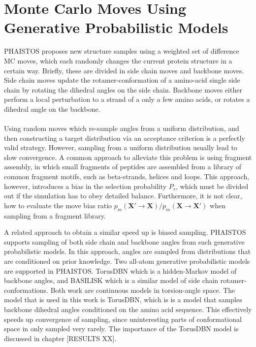 \section{Monte Carlo Moves Using Generative Probabilistic Models}
\label{chap:generative}
PHAISTOS proposes new structure samples using a weighted set of difference MC moves, which each randomly changes the current protein structure in a certain way. Briefly, these are divided in side chain moves and backbone moves.
Side chain moves update the rotamer-conformation of a amino-acid single side chain by rotating the dihedral angles on the side chain.
Backbone moves either perform a local perturbation to a strand of a only a few amino acids, or rotates a dihedral angle on the backbone.
\\\\Using random moves which re-sample angles from a uniform distribution, and then constructing a target distribution via an acceptance criterion is a perfectly valid strategy.
However, sampling from a uniform distribution usually lead to slow convergence.
A common approach to alleviate this problem is using fragment assembly, in which small fragments of peptides are assembled from a library of common fragment motifs, such as beta-strands, helices and loops.
This approach, however, introduces a bias in the selection probability $P_s$, which must be divided out if the simulation has to obey detailed balance.
Furthermore, it is not clear, how to evaluate the move bias ratio $p_m(\mathbf{X'} \rightarrow \mathbf{X}) / p_m(\mathbf{X} \rightarrow \mathbf{X'})$ when sampling from a fragment library.

A related approach to obtain a similar speed up is biased sampling.
PHAISTOS supports sampling of both side chain and backbone angles from such generative probabilistic models.
In this approach, angles are sampled from distributions that are conditioned on prior knowledge.
Two all-atom generative probabilistic models are supported in PHAISTOS.
TorusDBN which is a hidden-Markov model of backbone angles, and BASILISK which is a similar model of side chain rotamer-conformations.
Both work are continuous models in torsion-angle space.
The model that is used in this work is TorusDBN, which is is a model that samples backbone dihedral angles conditioned on the amino acid sequence.
This effectively speeds up convergence of sampling, since uninteresting parts of conformational space in only sampled very rarely.
The importance of the TorusDBN model is discussed in chapter [RESULTS XX].

